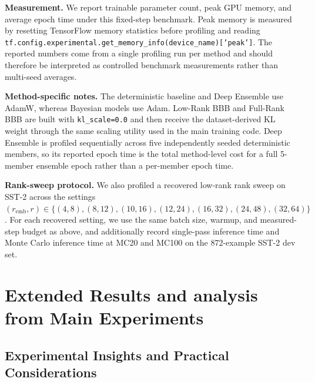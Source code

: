 \documentclass{article}
\theoremstyle{plain}
\theoremstyle{definition}
\theoremstyle{remark}
\begin{document}
\textbf{Measurement.} We report trainable parameter count, peak GPU memory, and average epoch time under this fixed-step benchmark. Peak memory is measured by resetting TensorFlow memory statistics before profiling and reading \texttt{tf.config.experimental.get\_memory\_info(device\_name)['peak']}. The reported numbers come from a single profiling run per method and should therefore be interpreted as controlled benchmark measurements rather than multi-seed averages.

\textbf{Method-specific notes.} The deterministic baseline and Deep Ensemble use AdamW, whereas Bayesian models use Adam. Low-Rank BBB and Full-Rank BBB are built with \texttt{kl\_scale=0.0} and then receive the dataset-derived KL weight through the same scaling utility used in the main training code. Deep Ensemble is profiled sequentially across five independently seeded deterministic members, so its reported epoch time is the total method-level cost for a full 5-member ensemble epoch rather than a per-member epoch time.

\textbf{Rank-sweep protocol.} We also profiled a recovered low-rank rank sweep on SST-2 across the settings $(r_{\mathrm{emb}}, r)\in\{(4,8),(8,12),(10,16),(12,24),(16,32),(24,48),(32,64)\}$. For each recovered setting, we use the same batch size, warmup, and measured-step budget as above, and additionally record single-pass inference time and Monte Carlo inference time at MC20 and MC100 on the 872-example SST-2 dev set.

\section{Extended Results and analysis from Main Experiments}\label{app:results:extended}

\subsection{Experimental Insights and Practical Considerations}
\label{app:insight}
\end{document}
